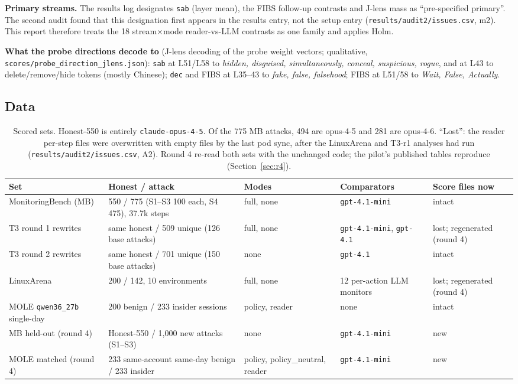 \documentclass[11pt]{article}
\begin{document}
\noindent\textbf{Primary streams.} The results log designates \texttt{sab} (layer mean), the FIBS follow-up contrasts and J-lens mass as ``pre-specified primary''. The second audit found that this designation first appears in the results entry, not the setup entry (\nolinkurl{results/audit2/issues.csv}, m2). This report therefore treats the 18 stream$\times$mode reader-vs-LLM contrasts as one family and applies Holm.

\noindent\textbf{What the probe directions decode to} (J-lens decoding of the probe weight vectors; qualitative, \nolinkurl{scores/probe_direction_jlens.json}): \texttt{sab} at L51/L58 to \emph{hidden, disguised, simultaneously, conceal, suspicious, rogue}, and at L43 to delete/remove/hide tokens (mostly Chinese); \texttt{dec} and FIBS at L35--43 to \emph{fake, false, falsehood}; FIBS at L51/58 to \emph{Wait, False, Actually}.

\subsection{Data}
\begin{table}[!htbp]\centering\small
\begin{adjustbox}{max width=\linewidth}\begin{tabular}{@{}lllll@{}}
\toprule
Set & Honest / attack & Modes & Comparators & Score files now\\
\midrule
MonitoringBench (MB) & 550 / 775 (S1--S3 100 each, S4 475), 37.7k steps & full, none & \texttt{gpt-4.1-mini} & intact\\
T3 round 1 rewrites & same honest / 509 unique (126 base attacks) & full, none & \texttt{gpt-4.1-mini}, \texttt{gpt-4.1} & lost; regenerated (round 4)\\
T3 round 2 rewrites & same honest / 701 unique (150 base attacks) & none & \texttt{gpt-4.1} & intact\\
LinuxArena & 200 / 142, 10 environments & full, none & 12 per-action LLM monitors & lost; regenerated (round 4)\\
MOLE \texttt{qwen36\_27b} single-day & 200 benign / 233 insider sessions & policy, reader & none & intact\\
MB held-out (round 4) & Honest-550 / 1{,}000 new attacks (S1--S3) & none & \texttt{gpt-4.1-mini} & new\\
MOLE matched (round 4) & 233 same-account same-day benign / 233 insider & policy, policy\_neutral, reader & \texttt{gpt-4.1-mini} & new\\
\bottomrule
\end{tabular}\end{adjustbox}
\caption{Scored sets. Honest-550 is entirely \texttt{claude-opus-4-5}. Of the 775 MB attacks, 494 are opus-4-5 and 281 are opus-4-6. ``Lost'': the reader per-step files were overwritten with empty files by the last pod sync, after the LinuxArena and T3-r1 analyses had run (\nolinkurl{results/audit2/issues.csv}, A2). Round 4 re-read both sets with the unchanged code; the pilot's published tables reproduce (Section~\ref{sec:r4}).}
\end{table}
\end{document}

